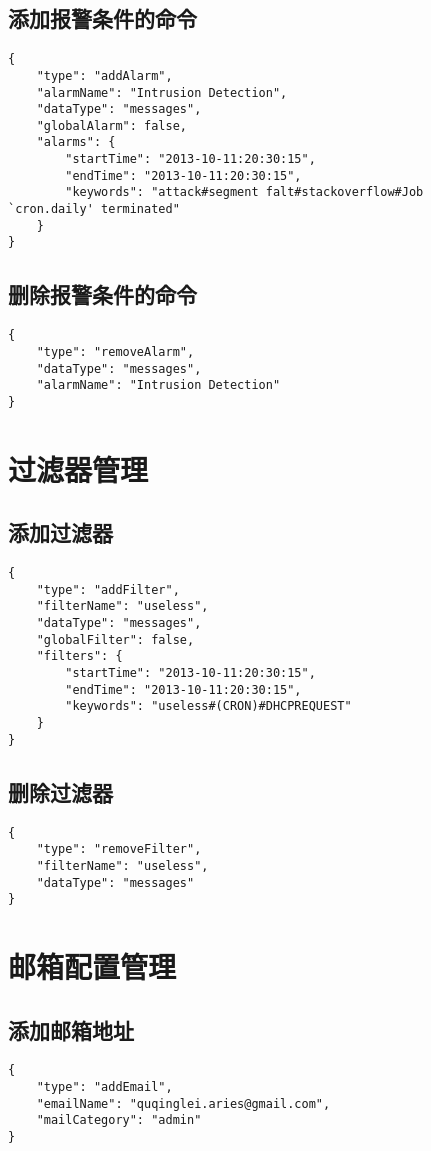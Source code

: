\documentclass{article}
\begin{document}
\subsection{添加报警条件的命令}
\begin{verbatim}
{
    "type": "addAlarm",
    "alarmName": "Intrusion Detection",
    "dataType": "messages",
    "globalAlarm": false,
    "alarms": {
        "startTime": "2013-10-11:20:30:15",
        "endTime": "2013-10-11:20:30:15",
        "keywords": "attack#segment falt#stackoverflow#Job `cron.daily' terminated"
    }
}
\end{verbatim}

\subsection{删除报警条件的命令}
\begin{verbatim}
{
    "type": "removeAlarm",
    "dataType": "messages",
    "alarmName": "Intrusion Detection"
}
\end{verbatim}

\section{过滤器管理}
\subsection{添加过滤器}
\begin{verbatim}
{
    "type": "addFilter",
    "filterName": "useless",
    "dataType": "messages",
    "globalFilter": false,
    "filters": {
        "startTime": "2013-10-11:20:30:15",
        "endTime": "2013-10-11:20:30:15",
        "keywords": "useless#(CRON)#DHCPREQUEST"
    }
}
\end{verbatim}
\subsection{删除过滤器}
\begin{verbatim}
{
    "type": "removeFilter",
    "filterName": "useless",
    "dataType": "messages"
}
\end{verbatim}

\section{邮箱配置管理}
\subsection{添加邮箱地址}
\begin{verbatim}
{
    "type": "addEmail",
    "emailName": "quqinglei.aries@gmail.com",
    "mailCategory": "admin"
}
\end{verbatim}
\end{document}
